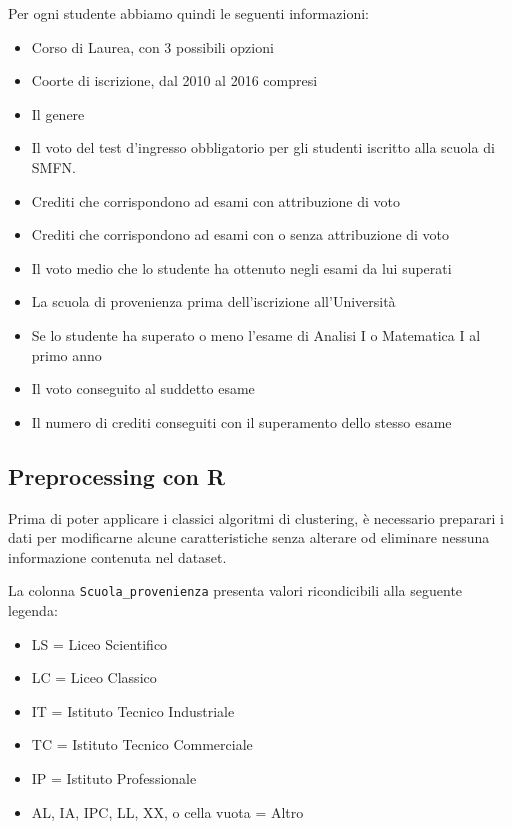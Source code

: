 \documentclass[
]{article}
\providecommand{\tightlist}{%
  \setlength{\itemsep}{0pt}\setlength{\parskip}{0pt}}
\begin{document}
Per ogni studente abbiamo quindi le seguenti informazioni:

\begin{itemize}
\tightlist
\item
  Corso di Laurea, con 3 possibili opzioni
\item
  Coorte di iscrizione, dal 2010 al 2016 compresi
\item
  Il genere
\item
  Il voto del test d'ingresso obbligatorio per gli studenti iscritto
  alla scuola di SMFN.
\item
  Crediti che corrispondono ad esami con attribuzione di voto
\item
  Crediti che corrispondono ad esami con o senza attribuzione di voto
\item
  Il voto medio che lo studente ha ottenuto negli esami da lui superati
\item
  La scuola di provenienza prima dell'iscrizione all'Università
\item
  Se lo studente ha superato o meno l'esame di Analisi I o Matematica I
  al primo anno
\item
  Il voto conseguito al suddetto esame
\item
  Il numero di crediti conseguiti con il superamento dello stesso esame
\end{itemize}

\hypertarget{preprocessing-con-r}{%
\subsection{Preprocessing con R}\label{preprocessing-con-r}}

Prima di poter applicare i classici algoritmi di clustering, è
necessario preparari i dati per modificarne alcune caratteristiche senza
alterare od eliminare nessuna informazione contenuta nel dataset.

La colonna \texttt{Scuola\_provenienza} presenta valori ricondicibili
alla seguente legenda:

\begin{itemize}
\tightlist
\item
  LS = Liceo Scientifico
\item
  LC = Liceo Classico
\item
  IT = Istituto Tecnico Industriale
\item
  TC = Istituto Tecnico Commerciale
\item
  IP = Istituto Professionale
\item
  AL, IA, IPC, LL, XX, o cella vuota = Altro
\end{itemize}
\end{document}
